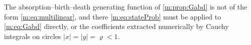 The absorption--birth--death generating function of \cref{m:prop:Gabd} is not of the
form \cref{m:eq:multilinear}, and there \cref{m:eq:stateProb} must be applied to
\cref{m:eq:Gabd} directly, or the coefficients extracted numerically by Cauchy
integrals on circles $|x|=|y|=\varrho<1$.

\renewcommand{\thesection}{\thechapter.\arabic{section}}
